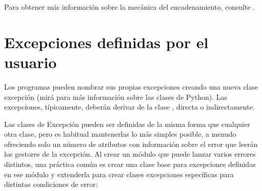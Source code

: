 \documentclass[a5paper,10pt,spanish]{sphinxmanual}
\begin{document}
\sphinxAtStartPar
Para obtener más información sobre la mecánica del encadenamiento, consulte .


\section{Excepciones definidas por el usuario}
\label{\detokenize{tutorial/errors:user-defined-exceptions}}\label{\detokenize{tutorial/errors:tut-userexceptions}}
\sphinxAtStartPar
Los programas pueden nombrar sus propias excepciones creando una nueva clase excepción (mirá {\hyperref[\detokenize{tutorial/classes:tut-classes}]{}} para más información sobre las clases de Python).  Las excepciones, típicamente, deberán derivar de la clase , directa o indirectamente.

\sphinxAtStartPar
Las clases de Excepción pueden ser definidas de la misma forma que cualquier otra clase, pero es habitual mantenerlas lo más simples posible, a menudo ofreciendo solo un número de atributos con información sobre el error que leerán los gestores de la excepción.  Al crear un módulo que puede lanzar varios errores distintos, una práctica común es crear una clase base para excepciones definidas en ese módulo y extenderla para crear clases excepciones específicas para distintas condiciones de error:
\end{document}
